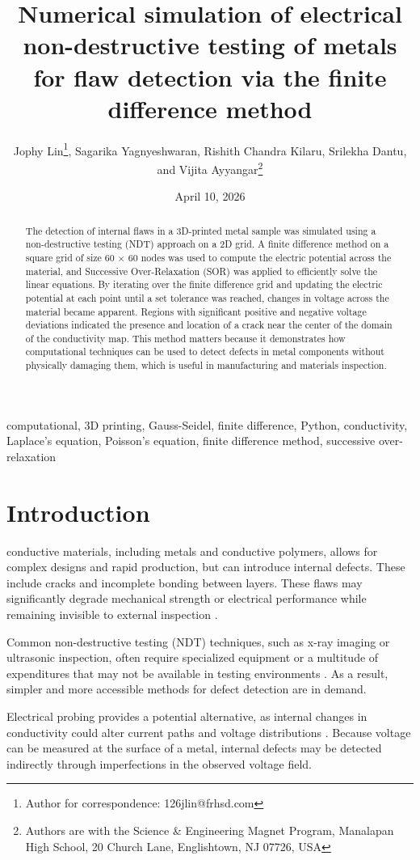 \documentclass[10pt,journal,twoside]{IEEEtran} %
\title{Numerical simulation of electrical non-destructive testing of metals for flaw detection via the finite difference method} %
\author{Jophy Lin\thanks{Author for correspondence: 126jlin@frhsd.com}, Sagarika Yagnyeshwaran, Rishith Chandra Kilaru, Srilekha Dantu, and Vijita Ayyangar\thanks{Authors are with the Science \& Engineering Magnet Program, Manalapan High School, 20 Church Lane, Englishtown, NJ 07726, USA}} %
\date{April 10, 2026}
\newcommand{\keywords}{computational, 3D printing, Gauss-Seidel, finite difference, Python, conductivity, Laplace's equation, Poisson's equation, finite difference method,  successive over-relaxation} %
\begin{document}
\maketitle

\begin{abstract}
The detection of internal flaws in a 3D-printed metal sample was simulated using a non-destructive testing (NDT) approach on a 2D grid. A finite difference method on a square grid of size 60 $\times$ 60 nodes was used to compute the electric potential across the material, and Successive Over-Relaxation (SOR) was applied to efficiently solve the linear equations. By iterating over the finite difference grid and updating the electric potential at each point until a set tolerance was reached, changes in voltage across the material became apparent. Regions with significant positive and negative voltage deviations indicated the presence and location of a crack near the center of the domain of the conductivity map. This method matters because it demonstrates how computational techniques can be used to detect defects in metal components without physically damaging them, which is useful in manufacturing and materials inspection.
\end{abstract}

\begin{IEEEkeywords}
\keywords
\end{IEEEkeywords}


\section{Introduction}
 conductive materials, including metals and conductive polymers, allows for complex designs and rapid production, but can introduce internal defects. These include cracks and incomplete bonding between layers. These flaws may significantly degrade mechanical strength or electrical performance while remaining invisible to external inspection \cite{dalal:2019:cracks}.

Common non-destructive testing (NDT) techniques, such as x-ray imaging or ultrasonic inspection, often require specialized equipment or a multitude of expenditures that may not be available in testing environments \cite{cawley:2001:nondestructive,davis:2004:nondestructive}. As a result, simpler and more accessible methods for defect detection are in demand.

Electrical probing provides a potential alternative, as internal changes in conductivity could alter current paths and voltage distributions \cite{hauptmann:2018:revealing}. Because voltage can be measured at the surface of a metal, internal defects may be detected indirectly through imperfections in the observed voltage field.
\end{document}
